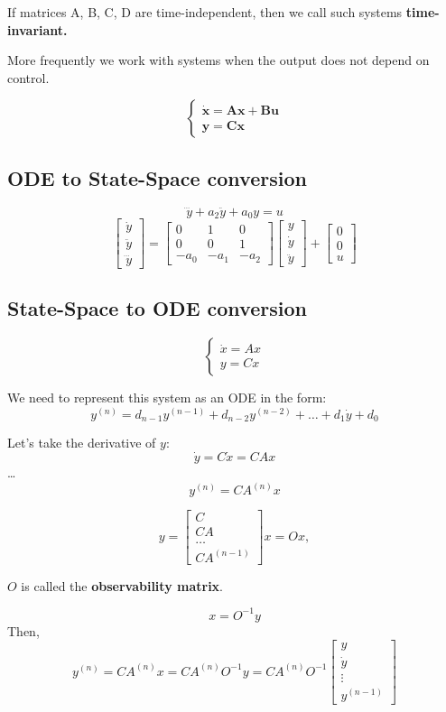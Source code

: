 If matrices A, B, C, D are time-independent, then we call such systems \textbf{time-invariant.} 

More frequently we work with systems when the output does not depend on control. 

\begin{equation}
    \begin{cases}
    \mathbf{\dot{x}}=\mathbf{A}\mathbf{x} + \mathbf{B}\mathbf{u} \\
    \mathbf{y}=\mathbf{C}\mathbf{x}
    \end{cases}
    \end{equation}


    
\subsection{ODE to State-Space conversion}
\[
\dddot{y} + a_2 \ddot{y} + a_0 y = u
\]
\[
\begin{bmatrix}
\dot{y} \\
\ddot{y} \\
\dddot{y}
\end{bmatrix} = 
\begin{bmatrix}
0 & 1 & 0 \\
0 & 0 & 1 \\
-a_0 & -a_1 & -a_2
\end{bmatrix}
\begin{bmatrix}
y \\
\dot{y} \\
\ddot{y}
\end{bmatrix} + 
\begin{bmatrix}
0 \\
0 \\
u
\end{bmatrix}
\]

\subsection{State-Space to ODE conversion}

\[
\begin{cases}
\dot{x} = Ax \\
y = Cx
\end{cases}
\]

We need to represent this system as an ODE in the form:
\[y^{(n)} = d_{n-1}y^{(n-1)} + d_{n-2}y^{(n-2)} + \dots + d_1 \dot{y} + d_0 \]

Let's take the derivative of \(y\):
\[\dot{y} = C\dot{x} = CAx\]
\dots
\[y^{(n)} = CA^{(n)} x\]

\[y = \begin{bmatrix} C \\ CA \\ \dots \\ CA^{(n-1)} \end{bmatrix} x = Ox, \]

\(O\) is called the \textbf{observability matrix}.

\[x  = O^{-1} y \]
Then, 
\[y^{(n)} = CA^{(n)} x = CA^{(n)}O^{-1} y = CA^{(n)}O^{-1}  \begin{bmatrix} y \\ \dot{y} \\ \vdots \\ y^{(n-1)}\end{bmatrix}\]
